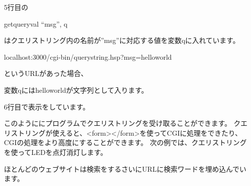 \bigskip

5行目の

getqueryval “msg”, q

はクエリストリング内の名前が”msg”に対応する値を変数qに入れています。

localhost:3000/cgi-bin/querystring.hsp?msg=helloworld

というURLがあった場合、

変数qにはhelloworldが文字列として入ります。

6行目で表示をしています。

このようににプログラムでクエリストリングを受け取ることができます。
クエリストリングが使えると、{\textless}form{\textgreater}{\textless}/form{\textgreater}を使ってCGIに処理をできたり、CGIの処理をより高度にすることができます。
次の例では、クエリストリングを使ってLEDを点灯消灯します。

ほとんどのウェブサイトは検索をするさいにURLに検索ワードを埋め込んでいます。

\begin{tcolorbox}[title=\useOmetoi,breakable]\label{Q:dynamicPage}
  \begin{enumerate}
  \end{enumerate}
\end{tcolorbox}

\clearpage

